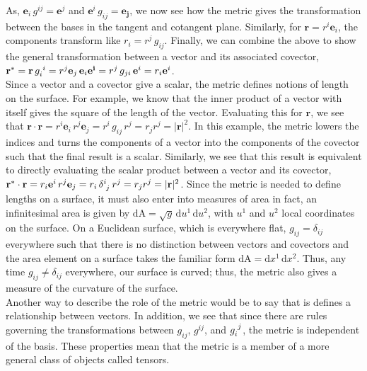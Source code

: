 \begin{appendices}
As, $\mathbf{e}_i \, g^{ij} = \mathbf{e}^j$ and $\mathbf{e}^i \, g_{ij} = \mathbf{e_j}$, we now see how the metric gives the transformation between the bases in the tangent and cotangent plane.
Similarly, for $\mathbf{r} = r^i\mathbf{e}_i$, the components transform like $r_i = r^j \, g_{ij}$.
Finally, we can combine the above to show the general transformation between a vector and its associated covector, $\mathbf{r}^* =\mathbf{r}\,\tensor{g}{_i^i} = r^j\mathbf{e}_j \, \mathbf{e}_i\mathbf{e^i} = r^j \, g_{ji} \, \mathbf{e}^i = r_i\mathbf{e}^i$. \\

Since a vector and a covector give a scalar, the metric defines notions of length on the surface.
For example, we know that the inner product of a vector with itself gives the square of the length of the vector.
Evaluating this for $\mathbf{r}$, we see that $\mathbf{r} \cdot \mathbf{r} = r^i \mathbf{e}_i \,r^j \mathbf{e}_j = r^i \, g_{ij} \, r^j = r_j r^j = |\mathbf{r}|^2$.
In this example, the metric lowers the indices and turns the components of a vector into the components of the covector such that the final result is a scalar.
Similarly, we see that this result is equivalent to directly evaluating the scalar product between a vector and its covector, $\mathbf{r}^* \cdot \mathbf{r} = r_i \mathbf{e}^i \, r^j \mathbf{e}_j = r_i \, \tensor{\delta}{^i_j} \, r^j = r_j r^j = |\mathbf{r}|^2$.
Since the metric is needed to define lengths on a surface, it must also enter into measures of area in fact, an infinitesimal area is given by $\textrm{dA} = \sqrt{g}\,\textrm{d}u^1 \, \textrm{d}u^2$, with $u^1$ and $u^2$ local coordinates on the surface.
On a Euclidean surface, which is everywhere flat, $g_{ij} = \delta_{ij}$ everywhere such that there is no distinction between vectors and covectors and the area element on a surface takes the familiar form $\textrm{dA} = \textrm{d}x^1 \, \textrm{d}x^2$.
Thus, any time $g_{ij} \neq \delta_{ij}$ everywhere, our surface is curved; thus, the metric also gives a measure of the curvature of the surface. \\

Another way to describe the role of the metric would be to say that is defines a relationship between vectors.
In addition, we see that since there are rules governing the transformations between $g_{ij}$, $g^{ij}$, and $\tensor{g}{_i^j}$, the metric is independent of the basis.
These properties mean that the metric is a member of a more general class of objects called tensors.





\end{appendices}
